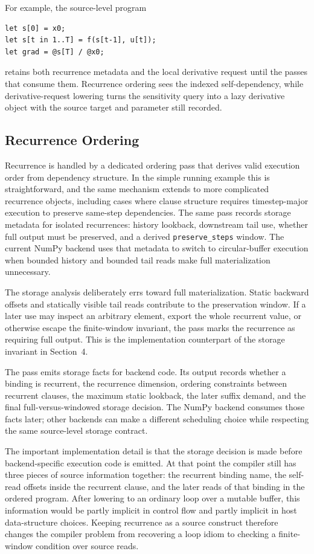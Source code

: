 \documentclass[sigplan,screen,nonacm]{acmart}
\begin{document}
For example, the source-level program
\begin{lstlisting}[style=einlang]
let s[0] = x0;
let s[t in 1..T] = f(s[t-1], u[t]);
let grad = @s[T] / @x0;
\end{lstlisting}
retains both recurrence metadata and the local derivative request until the passes that consume them. Recurrence ordering sees the indexed self-dependency, while derivative-request lowering turns the sensitivity query into a lazy derivative object with the source target and parameter still recorded.

\subsection{Recurrence Ordering}

Recurrence is handled by a dedicated ordering pass that derives valid execution order from dependency structure. In the simple running example this is straightforward, and the same mechanism extends to more complicated recurrence objects, including cases where clause structure requires timestep-major execution to preserve same-step dependencies. The same pass records storage metadata for isolated recurrences: history lookback, downstream tail use, whether full output must be preserved, and a derived \texttt{preserve\_steps} window. The current NumPy backend uses that metadata to switch to circular-buffer execution when bounded history and bounded tail reads make full materialization unnecessary.

The storage analysis deliberately errs toward full materialization. Static backward offsets and statically visible tail reads contribute to the preservation window. If a later use may inspect an arbitrary element, export the whole recurrent value, or otherwise escape the finite-window invariant, the pass marks the recurrence as requiring full output. This is the implementation counterpart of the storage invariant in Section~4.

The pass emits storage facts for backend code. Its output records whether a binding is recurrent, the recurrence dimension, ordering constraints between recurrent clauses, the maximum static lookback, the later suffix demand, and the final full-versus-windowed storage decision. The NumPy backend consumes those facts later; other backends can make a different scheduling choice while respecting the same source-level storage contract.

The important implementation detail is that the storage decision is made before backend-specific execution code is emitted. At that point the compiler still has three pieces of source information together: the recurrent binding name, the self-read offsets inside the recurrent clause, and the later reads of that binding in the ordered program. After lowering to an ordinary loop over a mutable buffer, this information would be partly implicit in control flow and partly implicit in host data-structure choices. Keeping recurrence as a source construct therefore changes the compiler problem from recovering a loop idiom to checking a finite-window condition over source reads.
\end{document}
